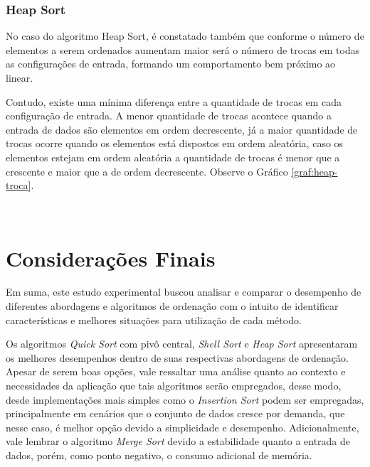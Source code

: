 \documentclass[conference]{IEEEtran}
\begin{document}
\subsubsection{Heap Sort}

No caso do algoritmo Heap Sort, é constatado também que conforme o número de elementos a serem ordenados aumentam maior será o número de trocas em todas as configurações de entrada, formando um comportamento bem próximo ao linear. 

Contudo, existe uma mínima diferença entre a quantidade de trocas em cada configuração de entrada. A menor quantidade de trocas acontece quando a entrada de dados são elementos em ordem decrescente, já a maior quantidade de trocas ocorre quando os elementos está dispostos em ordem aleatória, caso os elementos estejam em ordem aleatória a quantidade de trocas é menor que a crescente e maior que a de ordem decrescente. Observe o Gráfico \ref{graf:heap-troca}.


~\\

\section{Considerações Finais}

Em suma, este estudo experimental buscou analisar e comparar o desempenho de diferentes abordagens e algoritmos de ordenação com o intuito de identificar características e melhores situações para utilização de cada método.

Os algoritmos \textit{Quick Sort} com pivô central, \textit{Shell Sort} e \textit{Heap Sort} apresentaram os melhores desempenhos dentro de suas respectivas abordagens de ordenação. Apesar de serem boas opções, vale ressaltar uma análise quanto ao contexto e necessidades da aplicação que tais algoritmos serão empregados, desse modo, desde implementações mais simples como o \textit{Insertion Sort} podem ser empregadas, principalmente em cenários que o conjunto de dados cresce por demanda, que nesse caso, é melhor opção devido a simplicidade e desempenho. Adicionalmente, vale lembrar o algoritmo \textit{Merge Sort} devido a estabilidade quanto a entrada de dados, porém, como ponto negativo, o consumo adicional de memória.
\end{document}
